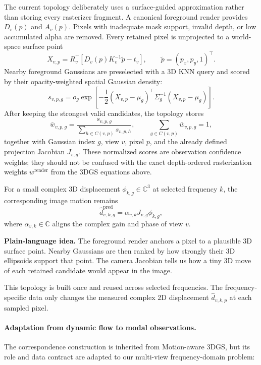 \documentclass[10pt]{article}
\newcommand{\plainidea}[1]{%
  \vspace{0.25em}
  \noindent\colorbox{SoftGray}{%
    \parbox{\dimexpr\linewidth-2\fboxsep\relax}{%
      \textbf{Plain-language idea.} #1}}
  \vspace{0.25em}
}
\begin{document}
The current topology deliberately uses a surface-guided approximation rather
than storing every rasterizer fragment. A canonical foreground render provides
$D_v(p)$ and $A_v(p)$. Pixels with inadequate mask support, invalid depth, or
low accumulated alpha are removed. Every retained pixel is unprojected to a
world-space surface point
\begin{equation}
  X_{v,p}
  =R_v^\top\left[
    D_v(p)K_v^{-1}\widetilde p-t_v
  \right],
  \qquad \widetilde p=(p_x,p_y,1)^\top.
\end{equation}
Nearby foreground Gaussians are preselected with a 3D KNN query and scored by
their opacity-weighted spatial Gaussian density:
\begin{equation}
  s_{v,p,g}
  =o_g\exp\!\left[
    -\frac12(X_{v,p}-\mu_g)^\top
    \Sigma_g^{-1}(X_{v,p}-\mu_g)
  \right].
\end{equation}
After keeping the strongest valid candidates, the topology stores
\begin{equation}
  \bar w_{v,p,g}
  =\frac{s_{v,p,g}}{\sum_{h\in C(v,p)}s_{v,p,h}},
  \qquad
  \sum_{g\in C(v,p)}\bar w_{v,p,g}=1,
\end{equation}
together with Gaussian index $g$, view $v$, pixel $p$, and the already defined
projection Jacobian $J_{v,g}$. These normalized scores are observation
confidence weights; they should not be confused with the exact depth-ordered
rasterization weights $w^{\mathrm{render}}$ from the 3DGS equations above.

For a small complex 3D displacement
$\phi_{k,g}\in\mathbb C^3$ at selected frequency $k$, the corresponding image
motion remains
\begin{equation}
  \widehat d^{\mathrm{pred}}_{v,k,g}
  =\alpha_{v,k}J_{v,g}\phi_{k,g},
\end{equation}
where $\alpha_{v,k}\in\mathbb C$ aligns the complex gain and phase of view $v$.

\plainidea{The foreground render anchors a pixel to a plausible 3D surface
point. Nearby Gaussians are then ranked by how strongly their 3D ellipsoids
support that point. The camera Jacobian tells us how a tiny 3D move of each
retained candidate would appear in the image.}

This topology is built once and reused across selected frequencies. The
frequency-specific data only changes the measured complex 2D displacement
$\widehat d_{v,k,p}$ at each sampled pixel.

\paragraph{Adaptation from dynamic flow to modal observations.}
The correspondence construction is inherited from Motion-aware 3DGS, but its
role and data contract are adapted to our multi-view frequency-domain problem:
\end{document}
